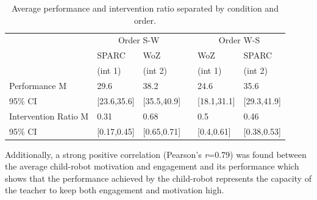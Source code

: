 \begin{table}[t]
	\caption{Average performance and intervention ratio separated by condition and order.}
	\centering
\begin{tabular}{@{}lllcll@{}}\toprule
	& \multicolumn{2}{c}{Order S-W} & \phantom{abc} & \multicolumn{2}{c}{Order W-S} \\
	\cmidrule{2-3} \cmidrule{5-6}
	& SPARC & WoZ && WoZ & SPARC \\
	& (int 1) & (int 2) && (int 1) & (int 2) \\
	\midrule			
Performance M & 29.6 & 38.2 && 24.6 & 35.6 \\
95\% CI & [23.6,35.6] & [35.5,40.9] && [18.1,31.1] & [29.3,41.9]\\[.2cm]
Intervention Ratio M & 0.31 & 0.68 && 0.5 & 0.46 \\
95\% CI & [0.17,0.45] & [0.65,0.71] && [0.4,0.61] & [0.38,0.53]\\
\bottomrule
\end{tabular}
\label{tab:woz_comp_means}
\end{table}


Additionally, a strong positive correlation (Pearson's \textit{r}=0.79) was found between the average child-robot motivation and engagement and its performance which shows that the performance achieved by the child-robot represents the capacity of the teacher to keep both engagement and motivation high.

